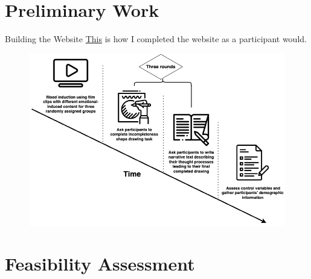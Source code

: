 \documentclass[pdf]{beamer}
\begin{document}
\section{Preliminary Work}
\begin{frame}{Building the Website}
 \href{https://www.kapwing.com/c/miV2nCSXYV}{This} is how I completed the website as a participant would. 
\begin{figure}
    \centering
    \includegraphics[height=0.6\textheight, keepaspectratio]{drawio/Experiment Timeline.png}
\end{figure}
\end{frame}

\section{Feasibility Assessment}
\end{document}
